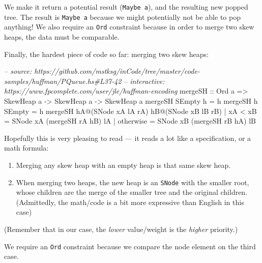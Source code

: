 \documentclass[]{article}
\newenvironment{Shaded}{}{}
\newcommand{\DataTypeTok}[1]{\textcolor[rgb]{0.56,0.13,0.00}{{#1}}}
\newcommand{\CommentTok}[1]{\textcolor[rgb]{0.38,0.63,0.69}{\textit{{#1}}}}
\newcommand{\OtherTok}[1]{\textcolor[rgb]{0.00,0.44,0.13}{{#1}}}
\newcommand{\FunctionTok}[1]{\textcolor[rgb]{0.02,0.16,0.49}{{#1}}}
\newcommand{\NormalTok}[1]{{#1}}
\begin{document}
We make it return a potential result (\texttt{Maybe\ a}), and the resulting new
popped tree. The result is \texttt{Maybe\ a} because we might potentially not be
able to pop anything! We also require an \texttt{Ord} constraint because in
order to merge two skew heaps, the data must be comparable.

Finally, the hardest piece of code so far: merging two skew heaps:

\begin{Shaded}
\begin{Highlighting}[]
\CommentTok{-- source: https://github.com/mstksg/inCode/tree/master/code-samples/huffman/PQueue.hs#L37-42}
\CommentTok{-- interactive: https://www.fpcomplete.com/user/jle/huffman-encoding}
\OtherTok{mergeSH ::} \DataTypeTok{Ord} \NormalTok{a }\OtherTok{=>} \DataTypeTok{SkewHeap} \NormalTok{a }\OtherTok{->} \DataTypeTok{SkewHeap} \NormalTok{a }\OtherTok{->} \DataTypeTok{SkewHeap} \NormalTok{a}
\NormalTok{mergeSH }\DataTypeTok{SEmpty} \NormalTok{h }\FunctionTok{=} \NormalTok{h}
\NormalTok{mergeSH h }\DataTypeTok{SEmpty} \FunctionTok{=} \NormalTok{h}
\NormalTok{mergeSH hA}\FunctionTok{@}\NormalTok{(}\DataTypeTok{SNode} \NormalTok{xA lA rA) hB}\FunctionTok{@}\NormalTok{(}\DataTypeTok{SNode} \NormalTok{xB lB rB)}
    \FunctionTok{|} \NormalTok{xA }\FunctionTok{<} \NormalTok{xB    }\FunctionTok{=} \DataTypeTok{SNode} \NormalTok{xA (mergeSH rA hB) lA}
    \FunctionTok{|} \NormalTok{otherwise  }\FunctionTok{=} \DataTypeTok{SNode} \NormalTok{xB (mergeSH rB hA) lB}
\end{Highlighting}
\end{Shaded}

Hopefully this is very pleasing to read --- it reads a lot like a specification,
or a math formula:

\begin{enumerate}
\def\labelenumi{\arabic{enumi}.}
\tightlist
\item
  Merging any skew heap with an empty heap is that same skew heap.
\item
  When merging two heaps, the new heap is an \texttt{SNode} with the smaller
  root, whose children are the merge of the smaller tree and the original
  children. (Admittedly, the math/code is a bit more expressive than English in
  this case)
\end{enumerate}

(Remember that in our case, the \emph{lower} value/weight is the \emph{higher}
priority.)

We require an \texttt{Ord} constraint because we compare the node element on the
third case.
\end{document}
